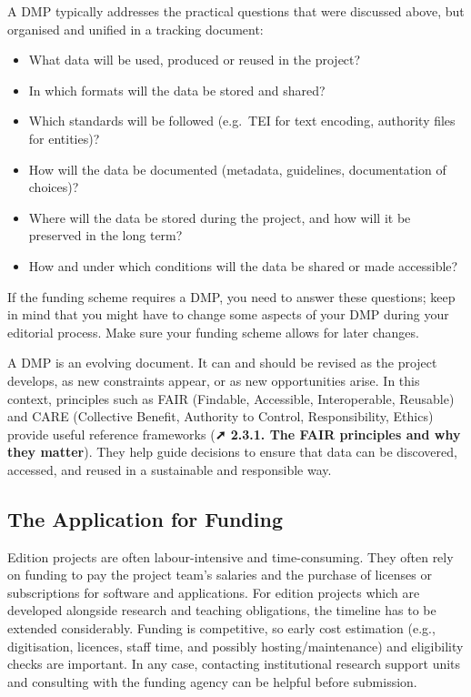 \documentclass[
  letterpaper,
  DIV=11,
  numbers=noendperiod]{scrreprt}
\begin{document}
A DMP typically addresses the practical questions that were discussed
above, but organised and unified in a tracking document:

\begin{itemize}
\item
  What data will be used, produced or reused in the project?
\item
  In which formats will the data be stored and shared?
\item
  Which standards will be followed (e.g.~TEI for text encoding,
  authority files for entities)?
\item
  How will the data be documented (metadata, guidelines, documentation
  of choices)?
\item
  Where will the data be stored during the project, and how will it be
  preserved in the long term?
\item
  How and under which conditions will the data be shared or made
  accessible?
\end{itemize}

If the funding scheme requires a DMP, you need to answer these
questions; keep in mind that you might have to change some aspects of
your DMP during your editorial process. Make sure your funding scheme
allows for later changes.

A DMP is an evolving document. It can and should be revised as the
project develops, as new constraints appear, or as new opportunities
arise. In this context, principles such as FAIR (Findable, Accessible,
Interoperable, Reusable) and CARE (Collective Benefit, Authority to
Control, Responsibility, Ethics) provide useful reference frameworks
(\textbf{➚ 2.3.1. The FAIR principles and why they matter}). They help
guide decisions to ensure that data can be discovered, accessed, and
reused in a sustainable and responsible way.

\subsection{The Application for
Funding}\label{the-application-for-funding}

Edition projects are often labour-intensive and time-consuming. They
often rely on funding to pay the project team's salaries and the
purchase of licenses or subscriptions for software and applications. For
edition projects which are developed alongside research and teaching
obligations, the timeline has to be extended considerably. Funding is
competitive, so early cost estimation (e.g., digitisation, licences,
staff time, and possibly hosting/maintenance) and eligibility checks are
important. In any case, contacting institutional research support units
and consulting with the funding agency can be helpful before submission.
\end{document}
